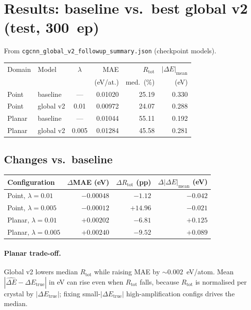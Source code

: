 \documentclass[11pt,a4paper]{article}
\newcommand{\dEtrue}{\Delta E_{\mathrm{true}}}
\newcommand{\dEhat}{\widehat{\Delta E}}
\begin{document}
\section*{Results: baseline vs.\ best global v2 (test, 300~ep)}

From \texttt{cgcnn\_global\_v2\_followup\_summary.json} (checkpoint models).

{\footnotesize
\begin{tabularx}{\linewidth}{@{}llcrrr@{}}
  \toprule
  Domain & Model & $\lambda$ & MAE & $R_{\mathrm{tot}}$ & $|\Delta E|_{\mathrm{mean}}$ \\
  & & & (eV/at.) & med.\ (\%) & (eV) \\
  \midrule
  Point  & baseline   & ---   & 0.01020 & 25.19 & 0.330 \\
  Point  & global v2  & 0.01  & 0.00972 & 24.07 & 0.288 \\
  Planar & baseline   & ---   & 0.01044 & 55.11 & 0.192 \\
  Planar & global v2  & 0.005 & 0.01284 & 45.58 & 0.281 \\
  \bottomrule
\end{tabularx}
}

\subsection*{Changes vs.\ baseline}

{\footnotesize
\begin{tabularx}{\linewidth}{@{}lrrr@{}}
  \toprule
  Configuration & $\Delta$MAE (eV) & $\Delta R_{\mathrm{tot}}$ (pp) &
  $\Delta|\Delta E|_{\mathrm{mean}}$ (eV) \\
  \midrule
  Point,  $\lambda=0.01$  & $-0.00048$ & $-1.12$  & $-0.042$ \\
  Point,  $\lambda=0.005$ & $-0.00012$ & $+14.96$ & $-0.021$ \\
  Planar, $\lambda=0.01$  & $+0.00202$ & $-6.81$  & $+0.125$ \\
  Planar, $\lambda=0.005$ & $+0.00240$ & $-9.52$  & $+0.089$ \\
  \bottomrule
\end{tabularx}
}

\paragraph{Planar trade-off.}
Global v2 lowers median $R_{\mathrm{tot}}$ while raising MAE by ${\sim}0.002$~eV/atom. Mean $|\dEhat-\dEtrue|$ in eV can rise even when $R_{\mathrm{tot}}$ falls, because $R_{\mathrm{tot}}$ is normalised per crystal by $|\dEtrue|$; fixing small-$|\dEtrue|$ high-amplification configs drives the median.
\end{document}
